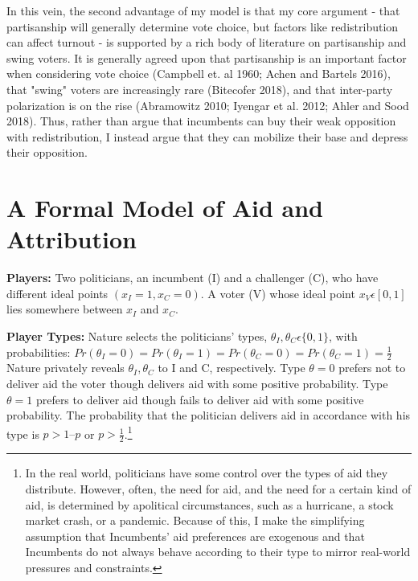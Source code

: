 \documentclass[12pt]{paper}
\begin{document}
In this vein, the second advantage of my model is that my core argument - that partisanship will generally determine vote choice, but factors like redistribution can affect turnout - is supported by a rich body of literature on partisanship and swing voters. It is generally agreed upon that partisanship is an important factor when considering vote choice (Campbell et. al 1960; Achen and Bartels 2016), that "swing" voters are increasingly rare (Bitecofer 2018), and that inter-party polarization is on the rise (Abramowitz 2010; Iyengar et al. 2012; Ahler and Sood 2018). Thus, rather than argue that incumbents can buy their weak opposition with redistribution, I instead argue that they can mobilize their base and depress their opposition.

\section{A Formal Model of Aid and Attribution}
\textbf{Players:} Two politicians, an incumbent (I) and a challenger (C), who have different ideal points $(x_I=1, x_C=0)$. A voter (V) whose ideal point $x_V \epsilon [0,1]$ lies somewhere between $x_I$ and $x_C.$

\textbf{Player Types:} Nature selects the politicians’ types, $\theta_I, \theta_C \epsilon \{0,1\}$, with probabilities: $Pr(\theta_I=0)=Pr(\theta_I=1)=Pr(\theta_C=0)=Pr(\theta_C=1)= \frac{1}{2}$ Nature privately reveals $\theta_I,\theta_C$ to I and C, respectively. Type $\theta=0$ prefers not to deliver aid the voter though delivers aid with some positive probability. Type $\theta=1$ prefers to deliver aid though fails to deliver aid with some positive probability. The probability that the politician delivers aid in accordance with his type is $p > 1 – p$ or $p > \frac{1}{2}$.\footnote{In the real world, politicians have some control over the types of aid they distribute. However, often, the need for aid, and the need for a certain kind of aid, is determined by apolitical circumstances, such as a hurricane, a stock market crash, or a pandemic. Because of this, I make the simplifying assumption that Incumbents' aid preferences are exogenous and that Incumbents do not always behave according to their type to mirror real-world pressures and constraints.}
\end{document}
